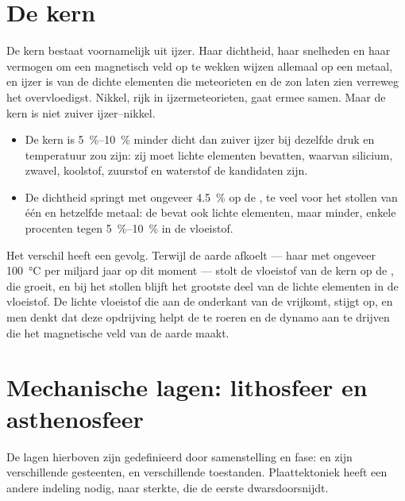 \section{De kern}

De kern bestaat voornamelijk uit ijzer. Haar dichtheid, haar snelheden en haar vermogen om een magnetisch veld op te wekken wijzen allemaal op een metaal, en
ijzer is van de dichte elementen die meteorieten en de zon laten zien verreweg het overvloedigst. Nikkel, rijk in ijzermeteorieten,
gaat ermee samen. Maar de kern is niet zuiver ijzer--nikkel.
\begin{itemize}
  \item De kern is \qtyrange{5}{10}{\percent} minder dicht dan zuiver ijzer bij dezelfde druk en temperatuur zou zijn: zij moet lichte elementen bevatten,
        waarvan silicium, zwavel, koolstof, zuurstof en waterstof de kandidaten zijn.
  \item De dichtheid springt met ongeveer \qty{4.5}{\percent} op de , te veel voor het stollen van één en hetzelfde metaal: de 
        bevat ook lichte elementen, maar minder, enkele procenten tegen \qtyrange{5}{10}{\percent} in de vloeistof.
\end{itemize}
Het verschil heeft een gevolg. Terwijl de aarde afkoelt --- haar  met ongeveer \qty{100}{\degreeCelsius} per miljard jaar op dit moment ---
stolt de vloeistof van de kern op de , die groeit, en
bij het stollen blijft het grootste deel van de lichte elementen in de vloeistof. De lichte vloeistof die aan de onderkant van de  vrijkomt, stijgt op,
en men denkt dat deze opdrijving helpt de  te roeren en de dynamo aan te drijven die het magnetische veld van de aarde maakt.

\section{Mechanische lagen: lithosfeer en asthenosfeer}

De lagen hierboven zijn gedefinieerd door samenstelling en fase:  en  zijn verschillende gesteenten,  en  verschillende toestanden.
Plaattektoniek heeft een andere indeling nodig, naar sterkte, die de eerste dwarsdoorsnijdt.

